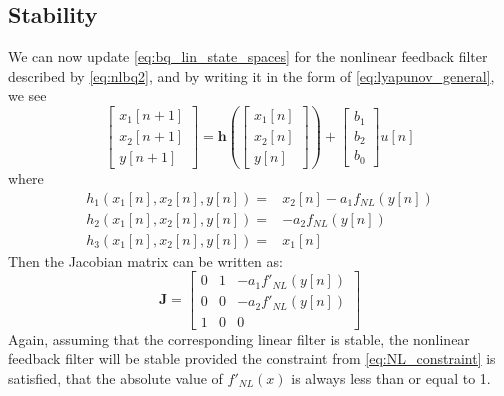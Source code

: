 \documentclass[twoside,a4paper]{article}
\begin{document}
\subsection{Stability}
%
We can now update \cref{eq:bq_lin_state_spaces} for the nonlinear
feedback filter described by \cref{eq:nlbq2}, and by writing it in the form
of \cref{eq:lyapunov_general}, we see
%
\begin{equation}
    \begin{bmatrix} x_1[n+1] \\ x_2[n+1] \\ y[n+1] \end{bmatrix} =
    \mathbf{h} \left( \begin{bmatrix} x_1[n] \\ x_2[n] \\ y[n] \end{bmatrix}
    \right) + \begin{bmatrix} b_1\\ b_2\\ b_0 \end{bmatrix} u[n]
    \label{eq:nlbq2_states}
\end{equation}
%
where
%
\begin{equation}
    \begin{split}
        h_1(x_1[n], x_2[n], y[n]) =& x_2[n] - a_1f_{NL}(y[n]) \\
        h_2(x_1[n], x_2[n], y[n]) =& -a_2f_{NL}(y[n]) \\
        h_3(x_1[n], x_2[n], y[n]) =& x_1[n]
    \end{split}
    \label{eq:nlbq2_state_eqns2}
\end{equation}
%
Then the Jacobian matrix can be written as:
%
\begin{equation}
    \mathbf{J} = \begin{bmatrix}
        0& 1& -a_1f'_{NL}(y[n]) \\
        0& 0& -a_2f'_{NL}(y[n]) \\
        1& 0& 0
    \end{bmatrix}
    \label{eq:nlbq2_Jacobian}
\end{equation}
%
Again, assuming that the corresponding linear filter is stable, the
nonlinear feedback filter will be stable provided the constraint
from \cref{eq:NL_constraint} is satisfied, that the absolute value
of $f'_{NL}(x)$ is always less than or equal to 1.
%
\end{document}
